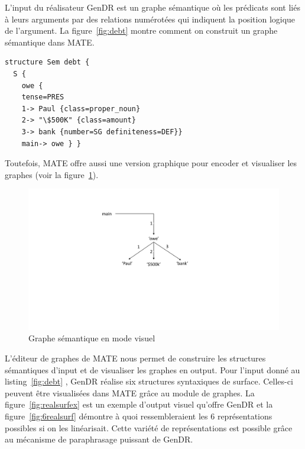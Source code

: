 L'input du réalisateur GenDR est un graphe sémantique \citep{mel2012semantics} où les prédicats sont liés à leurs arguments par des relations numérotées qui indiquent la position logique de l'argument. La figure~\ref{fig:debt} montre comment on construit un graphe sémantique dans MATE.

\begin{lstlisting}[language=mate, caption = Graphe sémantique en mode textuel, label=fig:debt]
structure Sem debt {
  S {
    owe {
    tense=PRES
    1-> Paul {class=proper_noun}
    2-> "\$500K" {class=amount}
    3-> bank {number=SG definiteness=DEF}}
    main-> owe } }
\end{lstlisting}

Toutefois, MATE offre aussi une version graphique pour encoder et visualiser les graphes (voir la figure~\ref{fig:graphesem}).

\begin{figure}[htb]
	\centering
	\includegraphics[width=1\textwidth, trim = {0cm 7cm 0cm 3cm},clip]{ch3/figs/owe_sem.pdf}
	\caption{Graphe sémantique en mode visuel}
	\label{fig:graphesem}
\end{figure}

L'éditeur de graphes de MATE nous permet de construire les structures sémantiques d'input et de visualiser les graphes en output. Pour l'input donné au listing~\ref{fig:debt} , GenDR réalise six structures syntaxiques de surface. Celles-ci peuvent être visualisées dans MATE grâce au module de graphes. La figure~\ref{fig:realsurfex} est un exemple d'output visuel qu'offre GenDR et la figure~\ref{fig:6realsurf} démontre à quoi ressembleraient les 6 représentations possibles si on les linéarisait. Cette variété de représentations est possible grâce au mécanisme de paraphrasage puissant de GenDR.

